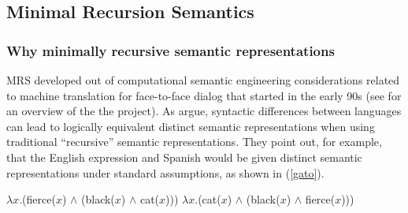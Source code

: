 \documentclass[output=paper]{langsci/langscibook}
\begin{document}
\subsection{Minimal Recursion Semantics}

\subsubsection{Why minimally recursive semantic representations}

MRS developed out of computational semantic engineering considerations related to machine translation for face-to-face dialog that started in the early 90s (see \citealt{Kayetal1992} for an overview of the the \verbmobil project). As \citet{Copestakeetal1995} argue, syntactic differences between languages can lead to logically equivalent distinct semantic representations when using traditional ``recursive'' semantic representations. They point out, for example, that the English expression  and Spanish  would be given distinct semantic representations under standard assumptions, as shown in (\ref{gato}).

\begin{exe}
\ex\label{gato}
\begin{xlist}
\ex\label{gatoa}
$\lambda x$.(fierce($x$) $\wedge$ (black($x$) $\wedge$ cat($x$)))
\ex\label{gatob}
$\lambda x$.(cat($x$) $\wedge$ (black($x$) $\wedge$ fierce($x$)))
\end{xlist}
\end{exe}
\end{document}
